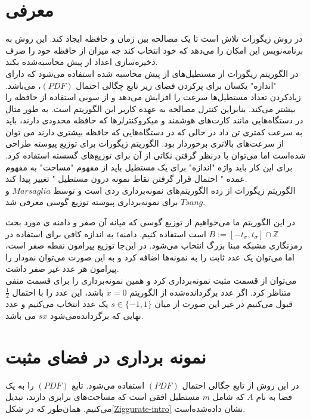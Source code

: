 \section{معرفی}

در روش زیگورات تلاش است تا یک مصالحه بین زمان و حافظه ایجاد کند. این روش به برنامه‌نویس این امکان را می‌دهد که خود انتخاب کند چه میزان از حافظه خود را صرف ذخیره‌سازی اعداد از پیش محاسبه‌شده بکند. 
\\
در الگوریتم زیگورات از مستطیل‌های از پیش محاسبه شده استفاده می‌شود که دارای "اندازه" یکسان برای پرکردن فضای زیر تابع چگالی احتمال $(PDF)$، می‌باشد. زیادکردن تعداد مستطیل‌ها سرعت را افزایش می‌دهد و از سویی استفاده از حافظه را بیشتر می‌کند. بنابراین کنترل مصالحه به عهده کاربر این الگوریتم است. به طور مثال در دستگاه‌هایی مانند کارت‌های هوشمند و میکروکنترلرها که حافظه محدودی دارند، باید به سرعت کمتری تن داد در حالی که در دستگاه‌هایی که حافظه بیشتری دارند می توان از سرعت‌های بالاتری برخوردار بود. الگوریتم زیگورات برای توزیع پیوسته طراحی شده‌است اما می‌توان با درنظر گرفتن نکاتی از آن برای توزیع‌های گسسته استفاده کرد. برای این کار باید واژه "اندازه" برای یک مستطیل  باید از مفهوم "مساحت" به مفهوم عمده " احتمال قرار گرفتن نقاط نمونه درون مستطیل " تغییر پیدا کند. 
\\
الگوریتم زیگورات از رده الگوریتم‌های نمونه‌برداری ردی است و توسط $Marsaglia$  و $Tsang$  برای نمونه‌برداری پیوسته توزیع گوسی معرفی شد. 
  
در این الگوریتم ما می‌خواهیم از توزیع گوسی که میانه آن صفر و دامنه ی مورد بحث $B :=[-t_{\sigma}, t_{\sigma}]\cap \mathbb{Z}$   است استفاده کنیم. دامنه$t$ به اندازه کافی  برای  استفاده در رمزنگاری مشبکه مبنا بزرگ انتخاب می‌شود. در این‌جا توزیع پیرامون نقطه صفر است، اما می‌توان یک عدد ثابت را به نمونه‌ها اضافه کرد و به این صورت می‌توان نمودار را پیرامون هر عدد غیر صفر داشت.
\\
می‌توان از قسمت مثبت نمونه‌برداری کرد و همین نمونه‌برداری را برای قسمت منفی متناظر کرد. اگر عدد برگردانده‌شده از الگوریتم $x = 0$ باشد، این عدد را با احتمال $\frac{1}{2}$ قبول می‌کنیم در غیر این صورت از میان $s\in \lbrace -1, 1\rbrace $ یک عدد انتخاب می‌کنیم و عدد نهایی که برگردانده‌می‌شود $sx$ می باشد.
\section{نمونه برداری در فضای مثبت }

در این روش از تابع چگالی احتمال $(PDF)$ استفاده می‌شود.  تابع $(PDF)$ را به یک فضا به نام $A$  که شامل $m$ مستطیل افقی است که مساحت‌های برابری دارند، تبدیل می‌کنیم. همان‌طور که در شکل\ref{Ziggurate-intro} نشان داده‌شده‌است.

